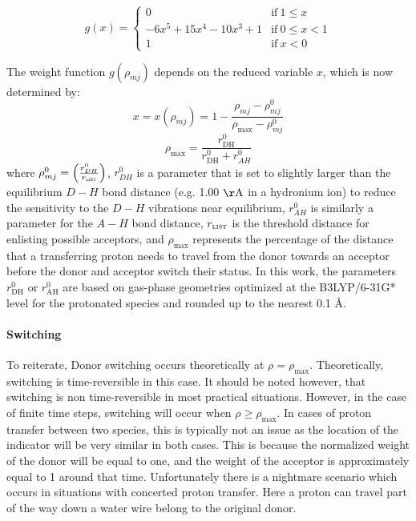 \documentclass{article}
\newcommand{\mr}[1]{\mathrm{#1}}
\begin{document}
\begin{equation} \label{eq:gofx_weight}
g(x) = \begin{cases}
0
& \mathrm{if}\ 1 \leq x \\
-6x^5 + 15x^4 - 10x^3 + 1
& \mathrm{if}\  0 \leq x < 1 \\
1
& \mathrm{if}\ x < 0 
\end{cases}
\end{equation}

The weight function $g ( \rho_{mj} )$ depends on the reduced variable $x$, which is now determined by:
\begin{equation}
x = x ( \rho_{mj} ) = 1 - \frac{\rho_{mj} - \rho^0_{mj}}{\rho_{\mathrm{max}} - \rho^0_{mj}}
\end{equation}
\begin{equation}
\rho_{\mathrm{max}} = \frac{r^0_{\mathrm{DH}}}{r^0_{\mathrm{DH}}+r^0_{AH}}
\end{equation}
where $\rho^0_{mj} = \left( \frac{r^0_{DH}}{r_{\mathrm{\textsc{list}}}} \right)$, $r^0_{DH}$ is a parameter that is set to slightly larger than the equilibrium $D-H$ bond distance (e.g. 1.00 $\mathrm{\AA}$ in a hydronium ion) to reduce the sensitivity to the $D-H$ vibrations near equilibrium, $r^0_{AH}$ is similarly a parameter for the $A-H$ bond distance, $r_{\mathrm{\textsc{list}}}$ is the threshold distance for enlisting possible acceptors, and $\rho_{\mathrm{max}}$ represents the percentage of the distance that a transferring proton needs to travel from the donor towards an acceptor before the donor and acceptor switch their status.
In this work, the parameters $r^0_{\mr{DH}}$ or $r^0_{\mr{AH}}$ are based on gas-phase geometries optimized at the B3LYP/6-31G* level for the protonated species and rounded up to the nearest 0.1 \AA.

\paragraph{Switching}
To reiterate, Donor switching occurs theoretically at $\rho = \rho_{\mr{max}}$.
Theoretically, switching is time-reversible in this case.
It should be noted however, that switching is non time-reversible in most practical situations. 
However, in the case of finite time steps, switching will occur when $\rho \geq \rho_{\mr{max}}$.
In cases of proton transfer between two species, this is typically not an issue as the location of the indicator will be very similar in both cases.
This is because the normalized weight of the donor will be equal to one, and the weight of the acceptor is approximately equal to 1 around that time.
Unfortunately there is a nightmare scenario which occurs in situations with concerted proton transfer.
Here a proton can travel part of the way down a water wire belong to the original donor.
\end{document}
